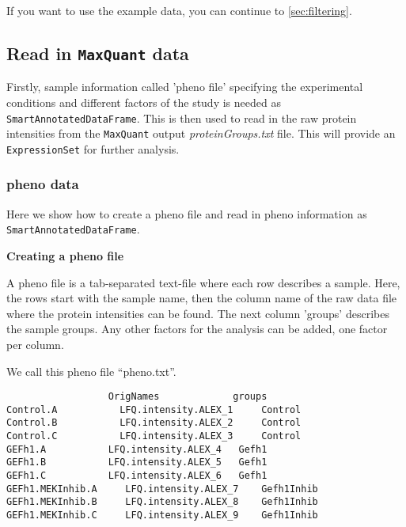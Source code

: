 \documentclass[a4paper,11pt]{article}
\newcommand{\Robject}[1]{{\texttt{#1}}}
\begin{document}
If you want to use the example data, you can continue to \ref{sec:filtering}.

\subsection{Read in \texttt{MaxQuant} data}

Firstly, sample information called 'pheno file' specifying the experimental conditions and different factors of the study is needed as \Robject{SmartAnnotatedDataFrame}. This is then used to read in the raw protein intensities from the \texttt{MaxQuant} output \emph{proteinGroups.txt} file. This will provide an \Robject{ExpressionSet} for further analysis.

\subsubsection{pheno data}

Here we show how to create a pheno file and read in pheno information
as \Robject{SmartAnnotatedDataFrame}.

\textbf{Creating a pheno file}

A pheno file is a tab-separated text-file where each row describes a sample.
Here, the rows start with the sample name, then the column name of the raw data file
where the protein intensities can be found. The next column 'groups' 
describes the sample groups. Any other 
factors for the analysis can be added, one factor per column.

We call this pheno file ``pheno.txt''.

\begin{verbatim}
                  OrigNames	            groups	    
Control.A	        LFQ.intensity.ALEX_1	 Control	    
Control.B	        LFQ.intensity.ALEX_2	 Control	    
Control.C	        LFQ.intensity.ALEX_3	 Control	    
GEFh1.A           LFQ.intensity.ALEX_4	 Gefh1	    
GEFh1.B           LFQ.intensity.ALEX_5	 Gefh1	    
GEFh1.C           LFQ.intensity.ALEX_6	 Gefh1	    
GEFh1.MEKInhib.A	 LFQ.intensity.ALEX_7	 Gefh1Inhib	 
GEFh1.MEKInhib.B	 LFQ.intensity.ALEX_8	 Gefh1Inhib	 
GEFh1.MEKInhib.C	 LFQ.intensity.ALEX_9	 Gefh1Inhib	 
\end{verbatim}
\end{document}
